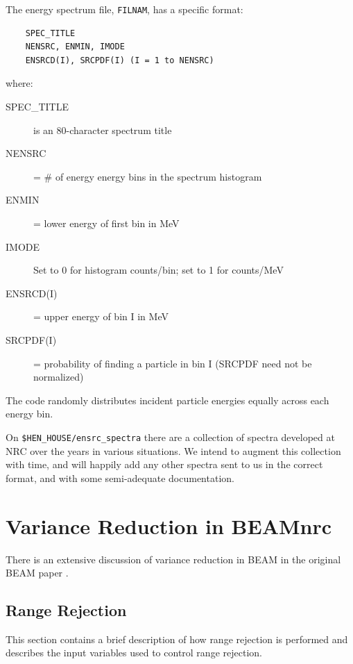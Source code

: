 \documentclass[12pt,twoside]{article}
\begin{document}
The energy spectrum file, \verb+FILNAM+, has a specific format:
\begin{verbatim}
	SPEC_TITLE
	NENSRC, ENMIN, IMODE
	ENSRCD(I), SRCPDF(I) (I = 1 to NENSRC)
\end{verbatim}
where:
\begin{description}
\item [SPEC\_TITLE] is an 80-character spectrum title
\item [NENSRC] = \# of energy energy bins in the spectrum histogram
\item [ENMIN] = lower energy of first bin in MeV
\item [IMODE] Set to 0 for histogram counts/bin; set to 1 for counts/MeV
\item [ENSRCD(I)] = upper energy of bin I in MeV
\item [SRCPDF(I)] = probability of finding a particle in bin I (SRCPDF
need not be normalized)
\end{description}
The code randomly distributes incident particle energies equally across
each energy bin.

On \verb+$HEN_HOUSE/ensrc_spectra+ there are a collection of spectra
developed at NRC over the years in various situations.  We intend to
augment this collection with time, and will happily add any other
spectra sent to us in the correct format, and with some semi-adequate
documentation.

\newpage
\section{Variance Reduction in BEAMnrc}
There is an extensive discussion of variance reduction in BEAM in the
original BEAM paper \cite{Ro95}.

\subsection{Range Rejection}
\label{RR}

This section contains a brief description of how range rejection
is performed and describes the input variables used to control range
rejection.
\end{document}

